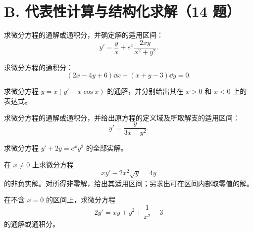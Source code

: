 \section{B. 代表性计算与结构化求解（14 题）}
\noindent\begin{minipage}{\linewidth}
求微分方程的通解或通积分，并确定解的适用区间：
\[y'=\frac yx+e^x\frac{2xy}{x^2+y^2}.\]
\end{minipage}\par\vspace{5pt}
\noindent\begin{minipage}{\linewidth}
求微分方程的通积分：
\[(2x-4y+6)\dd x+(x+y-3)\dd y=0.\]
\end{minipage}\par\vspace{5pt}
\noindent\begin{minipage}{\linewidth}
求微分方程 $y=x(y'-x\cos x)$ 的通解，并分别给出其在 $x>0$ 和 $x<0$ 上的表达式。
\end{minipage}\par\vspace{5pt}
\noindent\begin{minipage}{\linewidth}
求微分方程的通解或通积分，并给出原方程的定义域及所取解支的适用区间：
\[y'=\frac{y}{3x-y^2}.\]
\end{minipage}\par\vspace{5pt}
\noindent\begin{minipage}{\linewidth}
求微分方程 $y'+2y=e^xy^2$ 的全部实解。
\end{minipage}\par\vspace{5pt}
\noindent\begin{minipage}{\linewidth}
在 $x\ne0$ 上求微分方程
\[xy'-2x^2\sqrt y=4y\]
的非负实解。对所得非零解，给出其适用区间；另求出可在区间内部取零值的解。
\end{minipage}\par\vspace{5pt}
\noindent\begin{minipage}{\linewidth}
在不含 $x=0$ 的区间上，求微分方程
\[2y'=xy+y^2+\frac1{x^2}-3\]
的通解或通积分。
\end{minipage}\par\vspace{5pt}

